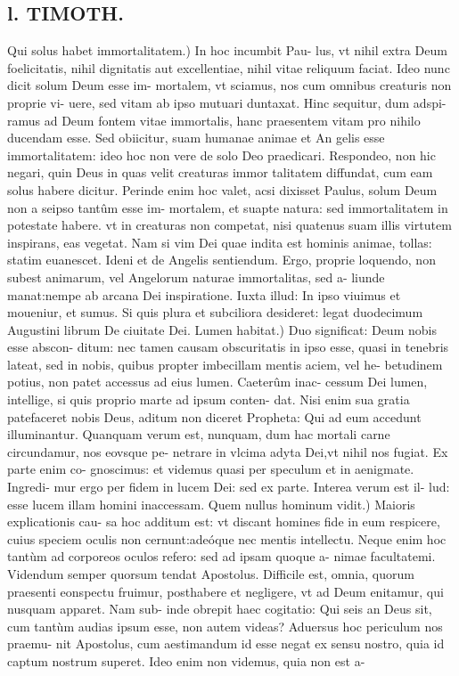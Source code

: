 \documentclass{article}
\begin{document}
\begin{pages}
\section*{l. TIMOTH. }
\marginpar{[ p.82 ]}\pstart Qui solus habet immortalitatem.) In hoc incumbit Pau- lus, vt nihil extra Deum foelicitatis, nihil dignitatis aut excellentiae, nihil vitae reliquum faciat. Ideo nunc dicit solum Deum esse im- mortalem, vt sciamus, nos cum omnibus creaturis non proprie vi- uere, sed vitam ab ipso mutuari duntaxat. Hinc sequitur, dum adspi- ramus ad Deum fontem vitae immortalis, hanc praesentem vitam pro nihilo ducendam esse. Sed obiicitur, suam humanae animae et An gelis esse immortalitatem: ideo hoc non vere de solo Deo praedicari. Respondeo, non hic negari, quin Deus in quas velit creaturas immor talitatem diffundat, cum eam solus habere dicitur. Perinde enim hoc valet, acsi dixisset Paulus, solum Deum non a seipso tantûm esse im- mortalem, et suapte natura: sed immortalitatem in potestate habere. vt in creaturas non competat, nisi quatenus suam illis virtutem inspirans, eas vegetat. Nam si vim Dei quae indita est hominis animae, tollas: statim euanescet. Ideni et de Angelis sentiendum. Ergo, proprie loquendo, non subest animarum, vel Angelorum naturae immortalitas, sed a- liunde manat:nempe ab arcana Dei inspiratione. Iuxta illud: In ipso viuimus et moueniur, et sumus. Si quis plura et subciliora desideret: legat duodecimum Augustini librum De ciuitate Dei.  \pend\pstart Lumen habitat.) Duo significat: Deum nobis esse abscon- ditum: nec tamen causam obscuritatis in ipso esse, quasi in tenebris lateat, sed in nobis, quibus propter imbecillam mentis aciem, vel he- betudinem potius, non patet accessus ad eius lumen. Caeterûm inac- cessum Dei lumen, intellige, si quis proprio marte ad ipsum conten- dat. Nisi enim sua gratia patefaceret nobis Deus, aditum non diceret Propheta: Qui ad eum accedunt illuminantur. Quanquam verum est, nunquam, dum hac mortali carne circundamur, nos eovsque pe- netrare in vlcima adyta Dei,vt nihil nos fugiat. Ex parte enim co- gnoscimus: et videmus quasi per speculum et in aenigmate. Ingredi- mur ergo per fidem in lucem Dei: sed ex parte. Interea verum est il- lud: esse lucem illam homini inaccessam.  \pend\pstart Quem nullus hominum vidit.) Maioris explicationis cau- sa hoc additum est: vt discant homines fide in eum respicere, cuius speciem oculis non cernunt:adeóque nec mentis intellectu. Neque enim hoc tantùm ad corporeos oculos refero: sed ad ipsam quoque a- nimae facultatemi. Videndum semper quorsum tendat Apostolus. Difficile est, omnia, quorum praesenti eonspectu fruimur, posthabere et negligere, vt ad Deum enitamur, qui nusquam apparet. Nam sub- inde obrepit haec cogitatio: Qui seis an Deus sit, cum tantùm audias ipsum esse, non autem videas? Aduersus hoc periculum nos praemu- nit Apostolus, cum aestimandum id esse negat ex sensu nostro, quia id captum nostrum superet. Ideo enim non videmus, quia non est a-  \pend

\end{pages}
\end{document}
